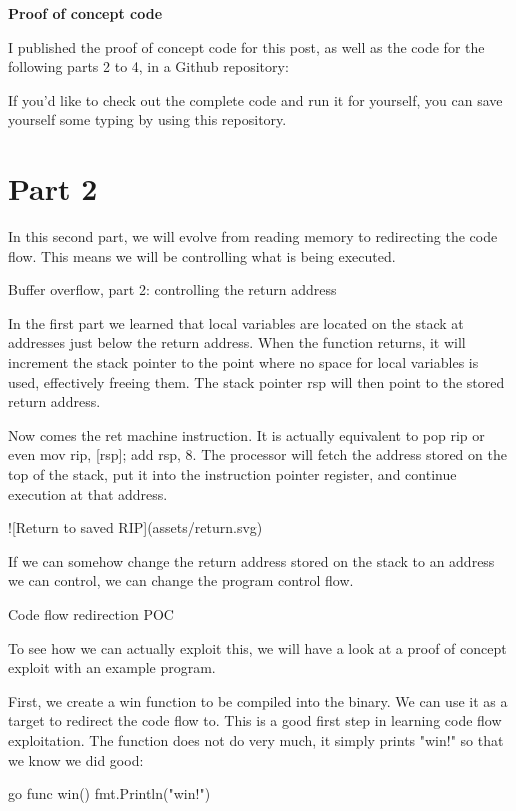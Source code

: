 \textbf{Proof of concept code}

I published the proof of concept code for this post, as well as the code for the following parts 2 to 4, in a Github
repository:

If you'd like to check out the complete code and run it for yourself, you can save yourself some typing by using this
repository.




\section{Part 2}

In this second part, we will evolve from reading memory to redirecting the code flow. This means we will be controlling
what is being executed. 

 Buffer overflow, part 2: controlling the return address

In the first part we learned that local variables are located on the stack at addresses just below the return address.
When the function returns, it will increment the stack pointer to the point where no space for local variables is used,
effectively freeing them. The stack pointer rsp will then point to the stored return address.

Now comes the ret machine instruction. It is actually equivalent to pop rip or even mov rip, [rsp]; add rsp, 8.
The processor will fetch the address stored on the top of the stack, put it into the instruction pointer register, and
continue execution at that address.

![Return to saved RIP](assets/return.svg)

If we can somehow change the return address stored on the stack to an address we can control, we can change the program
control flow.


 Code flow redirection POC

To see how we can actually exploit this, we will have a look at a proof of concept exploit with an example program.

First, we create a win function to be compiled into the binary. We can use it as a target to redirect the code
flow to. This is a good first step in learning code flow exploitation. The function does not do very much, it simply prints
"win!" so that we know we did good:

go
func win() 
    fmt.Println("win!")



